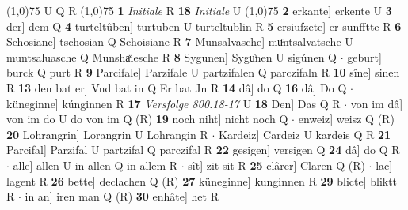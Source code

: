 \documentclass[8pt,a4paper,notitlepage]{article}
\begin{document}
\begin{table}[ht]
\begin{minipage}[t]{0.5\linewidth}
\line(1,0){75} \newline
U Q R \newline
\line(1,0){75} \newline
\textbf{1} \textit{Initiale} R  \textbf{18} \textit{Initiale} U  \newline
\line(1,0){75} \newline
\textbf{2} erkante] erkente U \textbf{3} der] dem Q \textbf{4} turteltûben] turtuben U turteltublin R \textbf{5} ersiufzete] er sunfftte R \textbf{6} Schosiane] tschosian Q Schoisiane R \textbf{7} Munsalvasche] muͦntsalvatsche U muntsaluasche Q Munshaͯlesche R \textbf{8} Sygunen] Syguͦnen U sigúnen Q  $\cdot$ geburt] burck Q purt R \textbf{9} Parcifale] Parzifale U partzifalen Q parczifaln R \textbf{10} sîne] sinen R \textbf{13} den bat er] Vnd bat in Q Er bat Jn R \textbf{14} dâ] do Q \textbf{16} dâ] Do Q  $\cdot$ küneginne] kúnginnen R \textbf{17} \textit{Versfolge 800.18-17} U  \textbf{18} Den] Das Q R  $\cdot$ von im dâ] von im do U do von im Q (R) \textbf{19} noch niht] nicht noch Q  $\cdot$ enweiz] weisz Q (R) \textbf{20} Lohrangrin] Lorangrin U Lohrangin R  $\cdot$ Kardeiz] Cardeiz U kardeis Q R \textbf{21} Parcifal] Parzifal U partzifal Q parczifal R \textbf{22} gesigen] versigen Q \textbf{24} dâ] do Q R  $\cdot$ alle] allen U in allen Q in allem R  $\cdot$ sît] zit sit R \textbf{25} clârer] Claren Q (R)  $\cdot$ lac] lagent R \textbf{26} bette] declachen Q (R) \textbf{27} küneginne] kunginnen R \textbf{29} blicte] bliktt R  $\cdot$ in an] iren man Q (R) \textbf{30} enhâte] het R \newline
\end{minipage}
\end{table}
\end{document}
